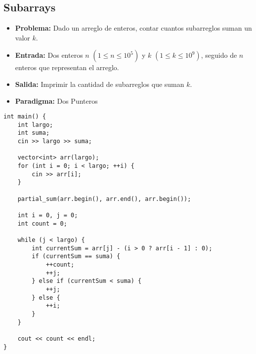 \subsection{Subarrays}
\begin{itemize}
  \item \textbf{Problema: }Dado un arreglo de enteros, contar cuantos subarreglos suman un valor $k$. 
  \item \textbf{Entrada: }Dos enteros $n$ $(1 \leq n \leq 10^5)$ y $k$ $(1 \leq k \leq 10^9)$, seguido de $n$ enteros que representan el arreglo. 
  \item \textbf{Salida: }Imprimir la cantidad de subarreglos que suman $k$. 

  \item \textbf{Paradigma: } Dos Punteros
\end{itemize}
\begin{lstlisting}[style=cpp]
int main() {
    int largo;
    int suma;
    cin >> largo >> suma;

    vector<int> arr(largo);
    for (int i = 0; i < largo; ++i) {
        cin >> arr[i];
    }
    
    partial_sum(arr.begin(), arr.end(), arr.begin());

    int i = 0, j = 0;
    int count = 0;

    while (j < largo) {
        int currentSum = arr[j] - (i > 0 ? arr[i - 1] : 0);
        if (currentSum == suma) {
            ++count;
            ++j;
        } else if (currentSum < suma) {
            ++j;
        } else {
            ++i;
        }
    }

    cout << count << endl;
}
\end{lstlisting}






